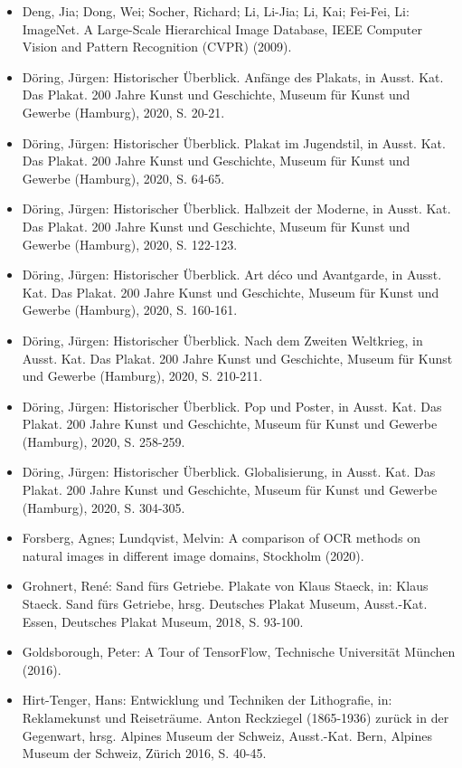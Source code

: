 \documentclass[a4paper,12pt,ngerman]{article}
\begin{document}
\begin{itemize}
\item Deng, Jia; Dong, Wei; Socher, Richard; Li, Li-Jia; Li, Kai; Fei-Fei, Li: ImageNet. A Large-Scale Hierarchical Image Database, IEEE Computer Vision and Pattern Recognition (CVPR) (2009).
\item Döring, Jürgen: Historischer Überblick. Anfänge des Plakats, in Ausst. Kat. Das Plakat. 200 Jahre Kunst und Geschichte, Museum für Kunst und Gewerbe (Hamburg), 2020, S. 20-21.
\item Döring, Jürgen: Historischer Überblick. Plakat im Jugendstil, in Ausst. Kat. Das Plakat. 200 Jahre Kunst und Geschichte, Museum für Kunst und Gewerbe (Hamburg), 2020, S. 64-65.
\item Döring, Jürgen: Historischer Überblick. Halbzeit der Moderne, in Ausst. Kat. Das Plakat. 200 Jahre Kunst und Geschichte, Museum für Kunst und Gewerbe (Hamburg), 2020, S. 122-123.
\item Döring, Jürgen: Historischer Überblick. Art déco und Avantgarde, in Ausst. Kat. Das Plakat. 200 Jahre Kunst und Geschichte, Museum für Kunst und Gewerbe (Hamburg), 2020, S. 160-161.
\item Döring, Jürgen: Historischer Überblick. Nach dem Zweiten Weltkrieg, in Ausst. Kat. Das Plakat. 200 Jahre Kunst und Geschichte, Museum für Kunst und Gewerbe (Hamburg), 2020, S. 210-211.
\item Döring, Jürgen: Historischer Überblick. Pop und Poster, in Ausst. Kat. Das Plakat. 200 Jahre Kunst und Geschichte, Museum für Kunst und Gewerbe (Hamburg), 2020, S. 258-259.
\item Döring, Jürgen: Historischer Überblick. Globalisierung, in Ausst. Kat. Das Plakat. 200 Jahre Kunst und Geschichte, Museum für Kunst und Gewerbe (Hamburg), 2020, S. 304-305.
\item Forsberg, Agnes; Lundqvist, Melvin: A comparison of OCR methods on natural images in different image domains, Stockholm (2020).
\item Grohnert, René: Sand fürs Getriebe. Plakate von Klaus Staeck, in: Klaus Staeck. Sand fürs Getriebe, hrsg. Deutsches Plakat Museum, Ausst.-Kat. Essen, Deutsches Plakat Museum, 2018, S. 93-100.
\item Goldsborough, Peter: A Tour of TensorFlow, Technische Universität München (2016).
\item Hirt-Tenger, Hans: Entwicklung und Techniken der Lithografie, in: Reklamekunst und Reiseträume. Anton Reckziegel (1865-1936) zurück in der Gegenwart, hrsg. Alpines Museum der Schweiz, Ausst.-Kat. Bern, Alpines Museum der Schweiz, Zürich 2016, S. 40-45.

\end{itemize}
\end{document}
